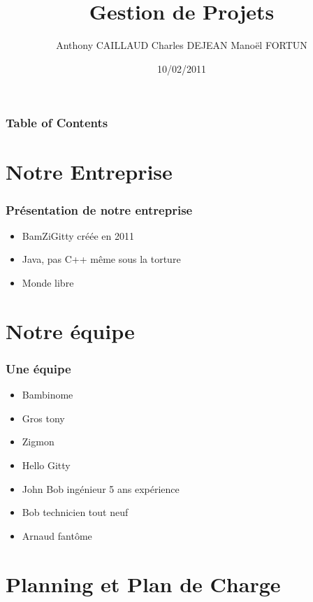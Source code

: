 \documentclass{beamer}
\title{Gestion de Projets}
\author{Anthony CAILLAUD Charles DEJEAN Manoël FORTUN}
\date{10/02/2011}
\begin{document}
\begin{frame}
\titlepage
\end{frame}



\begin{frame}
\frametitle{Table of Contents}
\tableofcontents[hideallsubsections]
\end{frame}

\section{Notre Entreprise}

\begin{frame}\frametitle{Présentation de notre entreprise}

\begin{itemize}
\item BamZiGitty créée en 2011
\item Java, pas C++ même sous la torture
\item Monde libre
\end{itemize}


\end{frame}

\section{Notre équipe}
\begin{frame}\frametitle{Une équipe}

\begin{itemize}
\item Bambinome
\item Gros tony
\item Zigmon
\item Hello Gitty
\item John Bob ingénieur 5 ans expérience
\item Bob technicien tout neuf
\item Arnaud fantôme
\end{itemize}


\end{frame}


\section{Planning et Plan de Charge}
\end{document}
